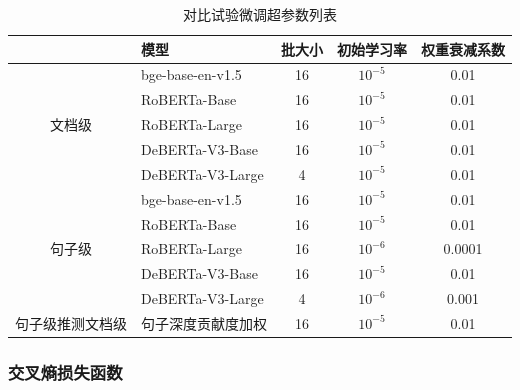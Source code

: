 \begin{table}[htbp]
\centering
\caption{对比试验微调超参数列表}
\label{tab:hyper-parameters}
\begin{tabular}{c|l|ccc}
\toprule
                          & \textbf{模型}   & \textbf{批大小} & \textbf{初始学习率} & \textbf{权重衰减系数} \\ \midrule
\multirow{5}{*}{文档级}   & bge-base-en-v1.5 \cite{bge_embedding} & 16                  & $10^{-5}$                & 0.01                  \\
                          & RoBERTa-Base \cite{liu_roberta_2019}     & 16                  & $10^{-5}$                & 0.01                  \\
                          & RoBERTa-Large \cite{liu_roberta_2019}    & 16                  & $10^{-5}$                & 0.01                  \\
                          & DeBERTa-V3-Base \cite{he2023debertav3improvingdebertausing}  & 16                  & $10^{-5}$                & 0.01                  \\
                          & DeBERTa-V3-Large \cite{he2023debertav3improvingdebertausing} & 4                   & $10^{-5}$                & 0.01                  \\ \midrule
\multirow{5}{*}{句子级}   & bge-base-en-v1.5 \cite{bge_embedding} & 16                  & $10^{-5}$                & 0.01                  \\
                          & RoBERTa-Base \cite{liu_roberta_2019}     & 16                  & $10^{-5}$                & 0.01                  \\
                          & RoBERTa-Large \cite{liu_roberta_2019}    & 16                  & $10^{-6}$               & 0.0001                \\
                          & DeBERTa-V3-Base \cite{he2023debertav3improvingdebertausing}  & 16                  & $10^{-5}$                & 0.01                  \\
                          & DeBERTa-V3-Large \cite{he2023debertav3improvingdebertausing} & 4                   & $10^{-6}$               & 0.001                 \\ \midrule
句子级推测文档级 & 句子深度贡献度加权 & 16 & $10^{-5}$ & 0.01 \\ \bottomrule
\end{tabular}
\end{table}

\subsubsection{交叉熵损失函数}

